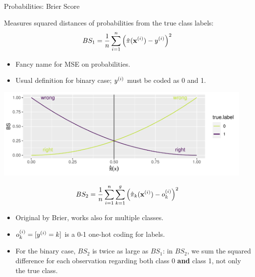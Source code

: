 \documentclass[11pt,compress,t,notes=noshow, xcolor=table]{beamer}
\newenvironment{knitrout}{}{} %
\begin{document}

\begin{vbframe}{Probabilities: Brier Score}

Measures squared distances of probabilities from the true class labels:
\[
BS_1 = \frac{1}{n} \sum\limits_{i=1}^n \left( \hat \pi(\mathbf{x}^{(i)}) - y^{(i)} \right)^2
\]

\begin{itemize}
  \item Fancy name for MSE on probabilities.
  \item Usual definition for binary case; $y^{(i)}$ must be coded as 0 and 1.
\end{itemize}

\lz

\begin{knitrout}\scriptsize
{}\color{fgcolor}

{\centering \includegraphics[width=0.95\textwidth]{figure/eval_mclass_1} 

}

\end{knitrout}


\framebreak

\[
BS_2 = \frac{1}{n} \sum\limits_{i=1}^n \sum\limits_{k=1}^g \left( \hat \pi_{k}(\mathbf{x}^{(i)}) - o_k^{(i)} \right)^2
\]
\begin{itemize}
  \item Original by Brier, works also for multiple classes.
  \item $ o_k^{(i)} = [ y^{(i)} = k ] $ is a 0-1 one-hot coding for labels.
  \item For the binary case, $BS_2$ is twice as large as $BS_1$: in 
  $BS_2$, we sum the squared difference for each observation regarding both 
  class 0 \textbf{and} class 1, not only the true class.
\end{itemize}

\end{vbframe}

\end{document}
